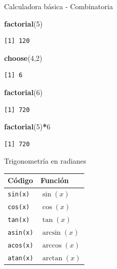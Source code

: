 \documentclass[
  ignorenonframetext,
]{beamer}
\newenvironment{Shaded}{\begin{snugshade}}{\end{snugshade}}
\newcommand{\DecValTok}[1]{\textcolor[rgb]{0.00,0.00,0.81}{#1}}
\newcommand{\KeywordTok}[1]{\textcolor[rgb]{0.13,0.29,0.53}{\textbf{#1}}}
\newcommand{\NormalTok}[1]{#1}
\newcommand{\OperatorTok}[1]{\textcolor[rgb]{0.81,0.36,0.00}{\textbf{#1}}}
\begin{document}
\begin{frame}[fragile]{Calculadora básica - Combinatoria}
\protect\hypertarget{calculadora-buxe1sica---combinatoria-3}{}

\begin{Shaded}
\begin{Highlighting}[]
\KeywordTok{factorial}\NormalTok{(}\DecValTok{5}\NormalTok{)}
\end{Highlighting}
\end{Shaded}

\begin{verbatim}
[1] 120
\end{verbatim}

\begin{Shaded}
\begin{Highlighting}[]
\KeywordTok{choose}\NormalTok{(}\DecValTok{4}\NormalTok{,}\DecValTok{2}\NormalTok{)}
\end{Highlighting}
\end{Shaded}

\begin{verbatim}
[1] 6
\end{verbatim}

\begin{Shaded}
\begin{Highlighting}[]
\KeywordTok{factorial}\NormalTok{(}\DecValTok{6}\NormalTok{)}
\end{Highlighting}
\end{Shaded}

\begin{verbatim}
[1] 720
\end{verbatim}

\begin{Shaded}
\begin{Highlighting}[]
\KeywordTok{factorial}\NormalTok{(}\DecValTok{5}\NormalTok{)}\OperatorTok{*}\DecValTok{6}
\end{Highlighting}
\end{Shaded}

\begin{verbatim}
[1] 720
\end{verbatim}

\end{frame}

\begin{frame}[fragile]{Trigonometría en radianes}
\protect\hypertarget{trigonometruxeda-en-radianes}{}

\begin{longtable}[]{@{}ll@{}}
\toprule
Código & Función\tabularnewline
\midrule
\endhead
\texttt{sin(x)} & \(\sin(x)\)\tabularnewline
\texttt{cos(x)} & \(\cos(x)\)\tabularnewline
\texttt{tan(x)} & \(\tan(x)\)\tabularnewline
\texttt{asin(x)} & \(\arcsin(x)\)\tabularnewline
\texttt{acos(x)} & \(\arccos(x)\)\tabularnewline
\texttt{atan(x)} & \(\arctan(x)\)\tabularnewline
\bottomrule
\end{longtable}

\end{frame}
\end{document}
